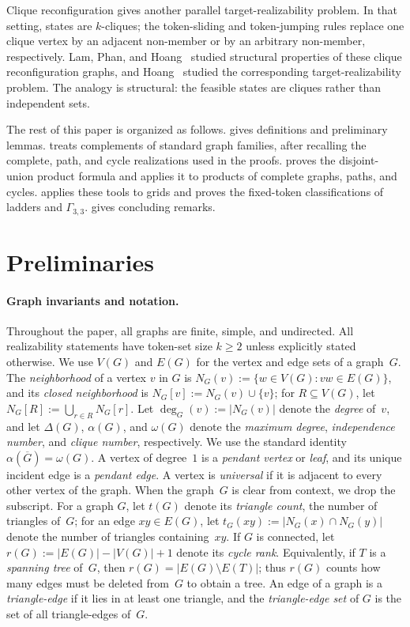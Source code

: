\documentclass[a4paper]{article}
\theoremstyle{plain}
\theoremstyle{definition}
\numberwithin{equation}{section}
\begin{document}
Clique reconfiguration gives another parallel target-realizability problem.
In that setting, states are $k$-cliques; the token-sliding and token-jumping rules replace one clique vertex by an adjacent non-member or by an arbitrary non-member, respectively.
Lam, Phan, and Hoang~\cite{LamPhanHoang2026} studied structural properties of these clique reconfiguration graphs, and Hoang~\cite{Hoang2026} studied the corresponding target-realizability problem.
The analogy is structural: the feasible states are cliques rather than independent sets.

The rest of this paper is organized as follows.
 gives definitions and preliminary lemmas.
 treats complements of standard graph families, after recalling the complete, path, and cycle realizations used in the proofs.
 proves the disjoint-union product formula and applies it to products of complete graphs, paths, and cycles.
 applies these tools to grids and proves the fixed-token classifications of ladders and $\Gamma_{3,3}$.
 gives concluding remarks.
\section{Preliminaries}
\label{sec:prelim}

\paragraph{Graph invariants and notation.}
Throughout the paper, all graphs are finite, simple, and undirected.
All realizability statements have token-set size $k\ge 2$ unless explicitly stated otherwise.
We use $V(G)$ and $E(G)$ for the vertex and edge sets of a graph~$G$.
The \emph{neighborhood} of a vertex $v$ in $G$ is $N_G(v):=\{w\in V(G):vw\in E(G)\}$, and its \emph{closed neighborhood} is $N_G[v]:=N_G(v)\cup\{v\}$; for $R\subseteq V(G)$, let $\displaystyle N_G[R]:=\bigcup_{r\in R}N_G[r]$.
Let $\deg_G(v):=|N_G(v)|$ denote the \emph{degree} of~$v$, and let $\Delta(G)$, $\alpha(G)$, and $\omega(G)$ denote the \emph{maximum degree}, \emph{independence number}, and \emph{clique number}, respectively.
We use the standard identity $\alpha(\overline{G})=\omega(G)$.
A vertex of degree~$1$ is a \emph{pendant vertex} or \emph{leaf}, and its unique incident edge is a \emph{pendant edge}.
A vertex is \emph{universal} if it is adjacent to every other vertex of the graph.
When the graph~$G$ is clear from context, we drop the subscript.
For a graph $G$, let $t(G)$ denote its \emph{triangle count}, the number of triangles of~$G$; for an edge $xy\in E(G)$, let $t_G(xy):=|N_G(x)\cap N_G(y)|$ denote the number of triangles containing~$xy$.
If $G$ is connected, let $r(G):=|E(G)|-|V(G)|+1$ denote its \emph{cycle rank}.
Equivalently, if $T$ is a \emph{spanning tree} of~$G$, then $r(G)=|E(G)\setminus E(T)|$; thus $r(G)$ counts how many edges must be deleted from~$G$ to obtain a tree.
An edge of a graph is a \emph{triangle-edge} if it lies in at least one triangle, and the \emph{triangle-edge set} of $G$ is the set of all triangle-edges of~$G$.
\end{document}

